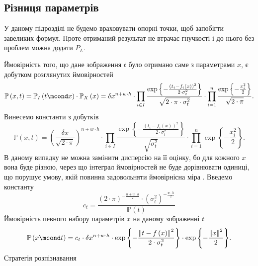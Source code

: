 \subsection{Різниця параметрів}

У даному підрозділі не будемо враховувати опорні точки,
щоб запобігти завеликих формул.
Проте отриманий результат не втрачає гнучкості
і до нього без проблем можна додати $P_L$.

Ймовірність того,
що дане зображення $t$ було отримано саме з параметрами $x$,
є добутком розглянутих ймовірностей
\begin{equation*}
  \mathbb{P}\left( x, t \right)
  = \mathbb{P}_I\left( t \mcond x \right)
    \cdot \mathbb{P}_X\left( x \right)
  = \delta x^{n + w \cdot h} \cdot \prod_{i \in I}
  \frac{\exp{\left\{ - \frac{\left( t_i - f_i\left( x \right) \right)^2}
       {2 \cdot \sigma_t^2} \right\}}}{\sqrt{2 \cdot \pi \cdot \sigma_t^2}}
  \cdot
  \prod_{i=1}^n
  \frac{\exp{\left\{ - \frac{x_i^2}{2} \right\}}}{\sqrt{2 \cdot \pi}}.
\end{equation*}
Винесемо константи з добутків
\begin{equation*}
  \mathbb{P}\left( x, t \right)
  = \left( \frac{\delta x}{\sqrt{2 \cdot \pi}} \right)^{n + w \cdot h}
    \cdot \prod_{i \in I}
    \frac{\exp{\left\{ - \frac{\left( t_i - f_i\left( x \right) \right)^2}
         {2 \cdot \sigma_t^2} \right\}}}{\sqrt{\sigma_t^2}}
    \cdot
    \prod_{i=1}^n
    \exp{\left\{ - \frac{x_i^2}{2} \right\}}.
\end{equation*}
В даному випадку не можна замінити дисперсію на її оцінку,
бо для кожного $x$ вона буде різною,
через що інтеграл ймовірностей не буде дорівнювати одиниці,
що порушує умову, якій повинна задовольняти ймовірнісна міра
\cite{dorogovtsev:1989}.
Введемо константу
\begin{equation*}
  c_t = \frac{
      \left( 2 \cdot \pi \right)^{- \frac{n + w \cdot h}{2}}
      \cdot \left( \sigma_t^2 \right)^{- \frac{w \cdot h}{2}}
    }{\mathbb{P}\left( t \right)}
\end{equation*}
Ймовірність певного набору параметрів $x$ на даному зображенні $t$
\begin{equation*}
  \mathbb{P}\left( x \mcond t \right)
  = c_t \cdot \delta x^{n + w \cdot h}
    \cdot \exp{\left\{ - \frac{\left\| t - f\left( x \right) \right\|^2}
                              {2 \cdot \sigma_t^2} \right\}}
    \cdot \exp{\left\{ - \frac{\left\| x \right\|^2}{2} \right\}}.
\end{equation*}
Стратегія розпізнавання
